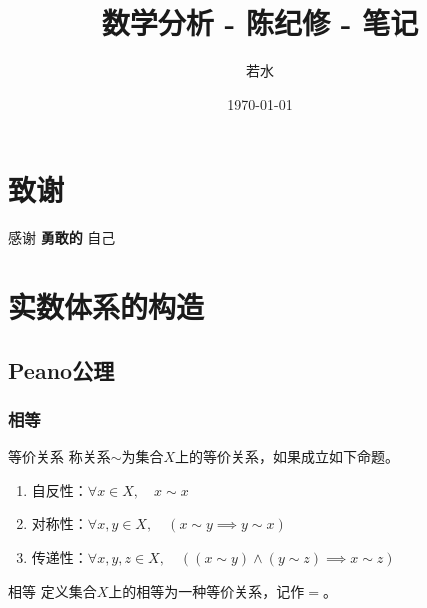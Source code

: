 \documentclass[lang = cn, scheme = chinese, thmcnt = section]{elegantbook}
\title{数学分析 - 陈纪修 - 笔记}                %
\author{若水}                        %
\date{\today}                       %
\begin{document}
	
	\maketitle       %
	
	\frontmatter     %
	
	\chapter*{致谢}
	
	
	\vspace*{\fill}
	\begin{center}
		
		\large{感谢 \textbf{ 勇敢的 } 自己}
		
	\end{center}
	\vspace*{\fill}
	
	\tableofcontents %
	
	\mainmatter      %

\chapter{实数体系的构造}

\section{Peano公理}

\subsection{相等}

\begin{definition}{等价关系}
	称关系$\sim$为集合$X$上的等价关系，如果成立如下命题。
	\begin{enumerate}
		\item 自反性：$\forall x\in X,\quad x \sim x$
		\item 对称性：$\forall x,y\in X,\quad (x\sim y\implies y\sim x)$
		\item 传递性：$\forall x,y,z\in X,\quad ((x\sim y)\wedge(y\sim z)\implies x\sim z)$
	\end{enumerate}
\end{definition}

\begin{definition}{相等}
	定义集合$X$上的相等为一种等价关系，记作$=$。
\end{definition}
\end{document}
